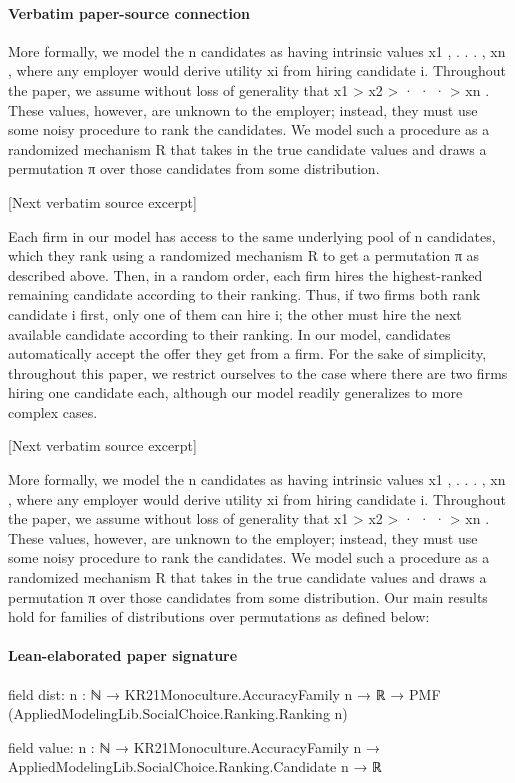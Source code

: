 \documentclass[10pt]{article}
\begin{document}
\paragraph{Verbatim paper-source connection}
\begin{ReviewVerbatim}
More formally, we model the n candidates as having intrinsic values x1 , . . . , xn , where any employer would
derive utility xi from hiring candidate i. Throughout the paper, we assume without loss of generality that
x1 > x2 > · · · > xn . These values, however, are unknown to the employer; instead, they must use some
noisy procedure to rank the candidates. We model such a procedure as a randomized mechanism R that
takes in the true candidate values and draws a permutation π over those candidates from some distribution.

[Next verbatim source excerpt]

Each firm in our model has access to the same underlying pool of n candidates, which they rank using
a randomized mechanism R to get a permutation π as described above. Then, in a random order, each
firm hires the highest-ranked remaining candidate according to their ranking. Thus, if two firms both rank
candidate i first, only one of them can hire i; the other must hire the next available candidate according to
their ranking. In our model, candidates automatically accept the offer they get from a firm. For the sake
of simplicity, throughout this paper, we restrict ourselves to the case where there are two firms hiring one
candidate each, although our model readily generalizes to more complex cases.

[Next verbatim source excerpt]

More formally, we model the n candidates as having intrinsic values x1 , . . . , xn , where any employer would
derive utility xi from hiring candidate i. Throughout the paper, we assume without loss of generality that
x1 > x2 > · · · > xn . These values, however, are unknown to the employer; instead, they must use some
noisy procedure to rank the candidates. We model such a procedure as a randomized mechanism R that
takes in the true candidate values and draws a permutation π over those candidates from some distribution.
Our main results hold for families of distributions over permutations as defined below:
\end{ReviewVerbatim}



\paragraph{Lean-elaborated paper signature}
\begin{ReviewVerbatim}
field dist:
{n : ℕ} → KR21Monoculture.AccuracyFamily n → ℝ → PMF (AppliedModelingLib.SocialChoice.Ranking.Ranking n)

field value:
{n : ℕ} → KR21Monoculture.AccuracyFamily n → AppliedModelingLib.SocialChoice.Ranking.Candidate n → ℝ
\end{ReviewVerbatim}
\end{document}

